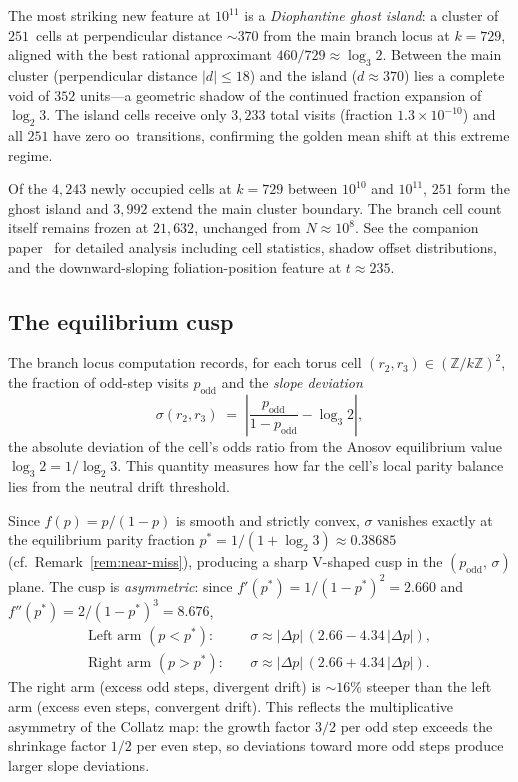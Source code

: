 \documentclass[manuscript]{aomart}
\newcommand{\Z}{\mathbb{Z}}
\theoremstyle{plain}
\theoremstyle{definition}
\theoremstyle{remark}
\numberwithin{equation}{section}
\begin{document}
The most striking new feature at $10^{11}$ is a \emph{Diophantine
ghost island}: a cluster of $251$~cells at perpendicular distance
${\sim}370$ from the main branch locus at $k = 729$, aligned with the
best rational approximant $460/729 \approx \log_3 2$.  Between the
main cluster (perpendicular distance $|d| \le 18$) and the island
($d \approx 370$) lies a complete void of $352$ units---a geometric
shadow of the continued fraction expansion of $\log_2 3$.  The island
cells receive only $3{,}233$ total visits (fraction $1.3 \times
10^{-10}$) and all $251$ have zero oo~transitions, confirming the
golden mean shift at this extreme regime.

Of the $4{,}243$ newly occupied cells at $k = 729$ between $10^{10}$
and $10^{11}$, $251$ form the ghost island and $3{,}992$ extend the
main cluster boundary.  The branch cell count itself remains
frozen at $21{,}632$, unchanged from $N \approx 10^8$.  See the
companion paper~\cite{Janik2026figures} for detailed analysis
including cell statistics, shadow offset distributions, and the
downward-sloping foliation-position feature at $t \approx 235$.

\subsection{The equilibrium cusp}
\label{sec:cusp}

The branch locus computation records, for each torus cell
$(r_2, r_3) \in (\Z/k\Z)^2$, the fraction of odd-step visits
$p_{\mathrm{odd}}$ and the \emph{slope deviation}
\[
  \sigma(r_2, r_3) \;=\;
  \left|\frac{p_{\mathrm{odd}}}{1 - p_{\mathrm{odd}}} - \log_3 2\right|,
\]
the absolute deviation of the cell's odds ratio from the Anosov
equilibrium value $\log_3 2 = 1/\log_2 3$.  This quantity measures
how far the cell's local parity balance lies from the neutral drift
threshold.

Since $f(p) = p/(1-p)$ is smooth and strictly convex, $\sigma$
vanishes exactly at the equilibrium parity fraction
$p^* = 1/(1 + \log_2 3) \approx 0.38685$
(cf.\ Remark~\ref{rem:near-miss}), producing a sharp V-shaped cusp
in the $(p_{\mathrm{odd}},\, \sigma)$ plane.  The cusp is
\emph{asymmetric}: since $f'(p^*) = 1/(1-p^*)^2 = 2.660$ and
$f''(p^*) = 2/(1-p^*)^3 = 8.676$,
\begin{align*}
  \text{Left arm } (p < p^*)\colon \quad
    &\sigma \approx |\Delta p|\,(2.66 - 4.34\,|\Delta p|), \\
  \text{Right arm } (p > p^*)\colon \quad
    &\sigma \approx |\Delta p|\,(2.66 + 4.34\,|\Delta p|).
\end{align*}
The right arm (excess odd steps, divergent drift) is $\sim\!16\%$
steeper than the left arm (excess even steps, convergent drift).
This reflects the multiplicative asymmetry of the Collatz map: the
growth factor $3/2$ per odd step exceeds the shrinkage factor $1/2$
per even step, so deviations toward more odd steps produce larger
slope deviations.
\end{document}
